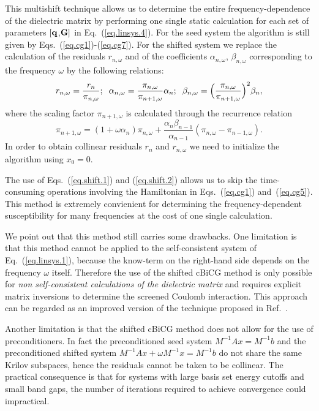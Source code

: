 \documentclass[twocolumn,prb,showpacs,superscriptaddress]{revtex4}
\def\w{\omega}
\def\q{{\bf q}}
\def\G{{\bf G}}
\begin{document}
This multishift technique allows us to determine the
entire frequency-dependence of the dielectric matrix
by performing one single static calculation for each set of parameters $[\q$,$\G]$ in
Eq.\ (\ref{eq.linsys.4}).
For the seed system the algorithm is still given by Eqs.\ (\ref{eq.cg1})-(\ref{eq.cg7}).
For the shifted system we replace the calculation of the residuals
$r_{n,\w}$ and of the coefficients $\alpha_{n,\w}$, $\beta_{n,\w}$ corresponding
to the frequency $\w$ by the following relations:
  \begin{equation} \label{eq.shift.1}
  r_{n,\w}  =\frac{r_n}{\pi_{n,\w}};
  \hspace{0.2cm}
  \alpha_{n,\w}  =  \frac{\pi_{n,\w}}{\pi_{n+1,\w}}\alpha_n ;
  \hspace{0.2cm}
  \beta_{n,\w}  =  \Big(\frac{\pi_{n,\w}}{\pi_{n+1,\w}}\Big)^2\beta_n,
  \end{equation}
where the scaling factor $\pi_{n+1,\w}$ is calculated through the recurrence relation
  \begin{equation}\label{eq.shift.2}
  \pi_{n+1,\w} = (1+\w\alpha_n) \pi_{n,\w} + \frac{\alpha_n\beta_{n-1}}{\alpha_{n-1}}(\pi_{n,\w}-\pi_{n-1,\w}).
  \end{equation}
In order to obtain collinear residuals $r_n$ and $r_{n,\w}$ we need to
initialize the algorithm using $x_0=0$.

The use of Eqs.~(\ref{eq.shift.1}) and (\ref{eq.shift.2}) allows us to
skip the time-consuming operations involving the Hamiltonian in
Eqs.\ (\ref{eq.cg1}) and~(\ref{eq.cg5}).
This method is extremely convienient for determining the frequency-dependent
susceptibility for many frequencies at the cost of one single calculation.

We point out that this method still carries some drawbacks.
One limitation is that this method cannot be applied to the self-consistent
system of Eq.\ (\ref{eq.linsys.1}), because the know-term on the
right-hand side depends on the frequency $\w$ itself.
Therefore the use of the shifted cBiCG method is only possible
for {\it non self-consistent calculations of the dielectric matrix}
and requires explicit matrix inversions to determine the screened
Coulomb interaction.
This approach can be regarded as an improved version 
of the technique proposed in Ref.\ .

Another limitation is that the shifted cBiCG method
does not allow for the use of preconditioners. In fact
the preconditioned seed system $M^{-1}Ax=M^{-1}b$ and the preconditioned shifted system
$M^{-1}Ax+\w M^{-1}x=M^{-1}b$ do not share the same Krilov subspaces, 
hence the residuals cannot be taken to be collinear.\cite{simoncini} 
The practical consequence is that for systems with
large basis set energy cutoffs and small band gaps, the number of iterations
required to achieve convergence could impractical.
\end{document}
